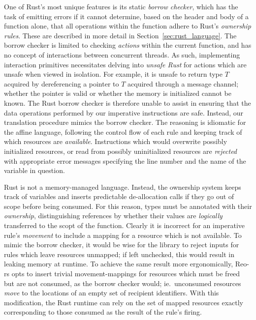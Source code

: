 One of Rust's most unique features is its static \textit{borrow checker}, which has the task of emitting errors if it cannot determine, based on the header and body of a function alone, that all operations within the function adhere to Rust's \textit{ownership rules}. These are described in more detail in Section~\ref{sec:rust_language}. The borrow checker is limited to checking \textit{actions} within the current function, and has no concept of interactions between concurrent threads. As such, implementing interaction primitives necessitates delving into \textit{unsafe Rust} for actions which are unsafe when viewed in isolation. For example, it is unsafe to return type $T$ acquired by dereferencing a pointer to $T$ acquired through a message channel; whether the pointer is valid or whether the memory is initialized cannot be known. The Rust borrow checker is therefore unable to assist in ensuring that the data operations performed by our imperative instructions are safe. Instead, our translation procedure mimics the borrow checker. The reasoning is idiomatic for the affine language, following the control flow of each rule and keeping track of which resources are \textit{available}. Instructions which would overwrite possibly initialized resources, or read from possibly uninitialized resources are \textit{rejected} with appropriate error messages specifying the line number and the name of the variable in question. 

Rust is not a memory-managed language. Instead, the ownership system keeps track of variables and inserts predictable de-allocation calls if they go out of scope before being consumed. For this reason, types must be annotated with their \textit{ownership}, distinguishing references by whether their values are \textit{logically} transferred to the scopt of the function. Clearly it is incorrect for an imperative rule's \textit{movement} to include a mapping for a resource which is not available. 
To mimic the borrow checker, it would be wise for the library to reject inputs for rules which leave resources unmapped; if left unchecked, this would result in leaking memory at runtime. To achieve the same result more ergonomically, Reo-rs opts to insert trivial movement-mappings for resources which must be freed but are not consumed, as the borrow checker would; ie.\ unconsumed resources \textit{move} to the locations of an empty set of recipient identifiers. With this modification, the Rust runtime can rely on the set of mapped resources exactly corresponding to those consumed as the result of the rule's firing. 

